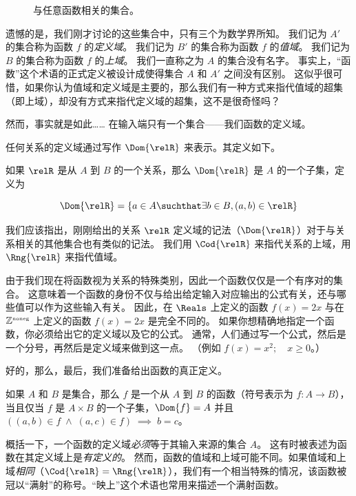 \begin{figure}[!hbtp]

\caption{与任意函数相关的集合。}
\label{fig:generic_function} 
\end{figure}

遗憾的是，我们刚才讨论的这些集合中，只有三个为数学界所知。
我们记为 $A'$ 的集合称为函数 $f$ 的\emph{定义域}。
我们记为 $B'$ 的集合称为函数 $f$ 的\emph{值域}。
我们记为 $B$ 的集合称为函数 $f$ 的\emph{上域}。
我们一直称之为 $A$ 的集合没有名字。
事实上，“函数”这个术语的正式定义被设计成使得集合 $A$ 和 $A'$ 之间没有区别。
这似乎很可惜，如果你认为值域和定义域是主要的，那么我们有一种方式来指代值域的超集（即上域），却没有方式来指代定义域的超集，这不是很奇怪吗？

然而，事实就是如此…… 在输入端只有一个集合——我们函数的定义域。

任何关系的定义域通过写作 $\Dom{\relR}$ 来表示。其定义如下。

\begin{defi}
如果 $\relR$ 是从 $A$ 到 $B$ 的一个关系，那么 $\Dom{\relR}$ 是 $A$ 的一个子集，定义为

\[ \Dom{\relR} = \{a \in A \suchthat \exists b \in B, (a,b) \in \relR \} 
\]

\end{defi}

我们应该指出，刚刚给出的关系 $\relR$ 定义域的记法（$\Dom{\relR}$）对于与关系相关的其他集合也有类似的记法。
我们用 $\Cod{\relR}$ 来指代关系的上域，用 $\Rng{\relR}$ 来指代值域。

由于我们现在将函数视为关系的特殊类别，因此一个函数仅仅是一个有序对的集合。
这意味着一个函数的身份不仅与给出给定输入对应输出的公式有关，还与哪些值可以作为这些输入有关。
因此，在 $\Reals$ 上定义的函数 $f(x)=2x$ 与在 ${\mathbb Z}^{\mbox{\tiny noneg}}$ 上定义的函数 $f(x)=2x$ 是完全不同的。
如果你想精确地指定一个函数，你必须给出它的定义域以及它的公式。
通常，人们通过写一个公式，然后是一个分号，再然后是定义域来做到这一点。
（例如 $f(x)=x^2; \quad x \geq 0$。）

好的，那么，最后，我们准备给出函数的真正定义。

\begin{defi}
如果 $A$ 和 $B$ 是集合，那么 $f$ 是一个从 $A$ 到 $B$ 的函数（符号表示为 $f:A\longrightarrow B$），当且仅当 $f$ 是 $A\times B$ 的一个子集，$\Dom{f}=A$ 并且 $((a,b) \in f \; \land \; (a,c) \in f) \; \implies \; b=c$。
\end{defi}

概括一下，一个函数的定义域\emph{必须}等于其输入来源的集合 $A$。
这有时被表述为函数在其定义域上是\emph{有定义的}。
然而，函数的值域和上域可能不同。如果值域和上域\emph{相同}（$\Cod{\relR} = \Rng{\relR}$），我们有一个相当特殊的情况，该函数被冠以“满射”的称号。“映上”这个术语也常用来描述一个满射函数。


